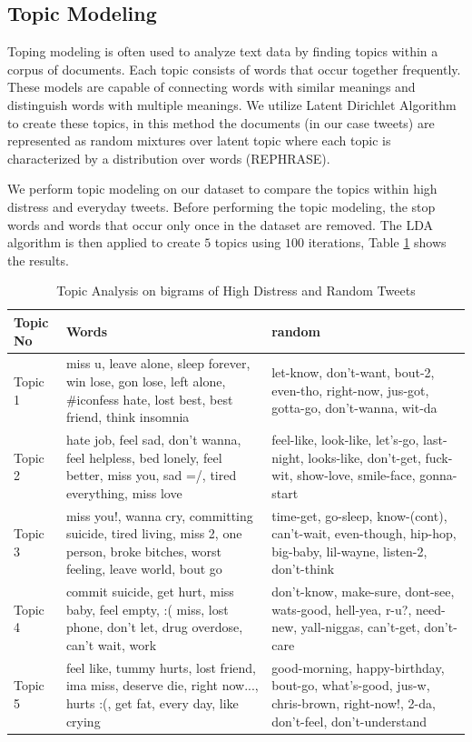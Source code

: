 \documentclass[11pt]{article}
\begin{document}
\subsection{Topic Modeling}

Toping modeling is often used to analyze text data by finding topics within a corpus of documents. Each topic consists of words that occur together frequently. These models are capable of connecting words with similar meanings and distinguish words with multiple meanings. We utilize  Latent Dirichlet Algorithm  \cite{Blei} to create these topics, in this method the documents (in our case tweets) are represented as random mixtures over latent topic where each topic is characterized by a distribution over words (REPHRASE). 

We perform topic modeling on our dataset to compare the topics within high distress and everyday tweets. Before performing the topic modeling, the stop words and words that occur only once in the dataset are removed. The LDA algorithm is then applied to create $5$ topics using $100$ iterations, Table \ref{tab:tm} shows the results.

\begin{table}[h]
    \centering
    \tiny 
    \begin{tabular}{|p{0.5cm}|p{3cm}|p{3cm}|}
    \hline
    \textbf{Topic No } & \textbf{Words} & \textbf {random}  \\ \hline
    \vfill \vfill Topic 1 & miss u, leave alone, sleep forever, win lose, gon lose, left alone, \#iconfess hate, lost best, best friend, think insomnia & let-know, don't-want, bout-2, even-tho, right-now, jus-got, gotta-go, don't-wanna, wit-da\\ \hline
    \vfill \vfill Topic 2 & hate job, feel sad, don't wanna, feel helpless, bed lonely, feel better, miss you, sad =/, tired everything, miss love &  feel-like, look-like, let's-go, last-night, looks-like, don't-get, fuck-wit, show-love, smile-face, gonna-start \\ \hline
    \vfill \vfill Topic 3 & miss you!, wanna cry, committing suicide, tired living, miss 2, one person, broke bitches, worst feeling, leave world, bout go & time-get, go-sleep, know-(cont), can't-wait, even-though, hip-hop, big-baby, lil-wayne, listen-2, don't-think \\ \hline
    \vfill \vfill Topic 4 & commit suicide, get hurt, miss baby, feel empty, :( miss, lost phone, don't let, drug overdose, can't wait, \@ work & don't-know, make-sure, dont-see, wats-good, hell-yea, r-u?, need-new, yall-niggas, can't-get, don't-care\\ \hline
     \vfill \vfill Topic 5 & feel like, tummy hurts, lost friend, ima miss, deserve die, right now..., hurts :(, get fat, every day, like crying  & good-morning, happy-birthday, bout-go, what's-good, jus-w, chris-brown, right-now!, 2-da, don't-feel, don't-understand \\ \hline
    \end{tabular}
 \caption {Topic Analysis on bigrams of High Distress and Random Tweets }

\label{tab:tm}
\end{table}
\end{document}
